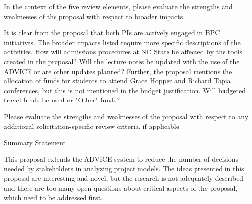 In the context of the five review elements, please
evaluate the strengths and weaknesses of the proposal with respect to broader impacts.

It is clear from the proposal that both PIs are actively engaged in BPC initiatives.
The broader impacts listed require more specific descriptions of the activities. How will admissions procedures at NC State be affected by the tools created in the proposal? Will the lecture notes be updated with the use of the ADVICE or are other updates planned?
Further, the proposal mentions the allocation of funds for students to attend Grace Hopper and Richard Tapia conferences, but this is not mentioned in the budget justification. Will budgeted travel funds be used or "Other" funds?

Please evaluate the strengths and
weaknesses of the proposal with respect to any additional solicitation-specific review criteria, if
applicable



Summary Statement

This proposal extends the ADVICE system to reduce the number of decisions needed by stakeholders in analyzing project models. The ideas presented in this proposal are interesting and novel, but the research is not adequately described and there are too many open questions about critical aspects of the proposal, which need to be addressed first.

